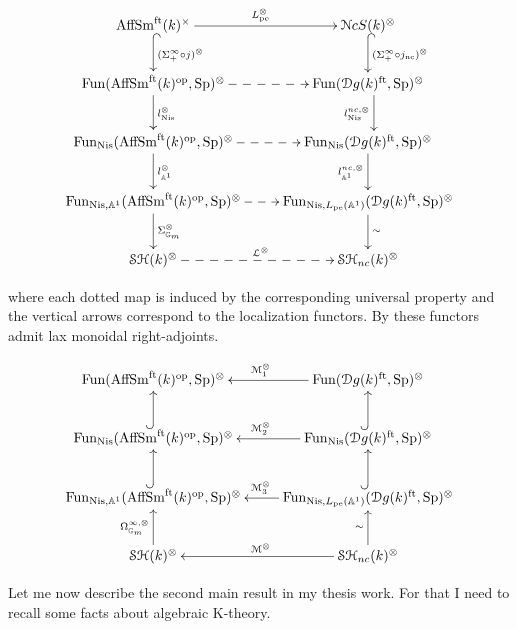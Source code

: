 \begin{refsection}
\begin{equation}
\label{diagramaleft}
\xymatrix{
\aff^{\times}\ar@{^{(}->}[d]^{(\Sigma^{\infty}_{+}\circ j)^{\otimes}}\ar[r]^{L_\mathrm{pe}^{\otimes}}& \nck^{\otimes}\ar@{^{(}->}[d]^{(\Sigma^{\infty}_{+}\circ j_{\mathrm{nc}})^{\otimes}}\\
\mathrm{Fun}(\aff^\mathrm{op}, \Sp)^{\otimes}\ar[d]^{l_\mathrm{Nis}^{\otimes}}\ar@{-->}[r]& \mathrm{Fun}(\mathcal{D}g(k)^\mathrm{ft}, \Sp)^{\otimes}\ar@<1ex>[d]_{l_\mathrm{Nis}^{nc, \otimes}}\\
\mathrm{Fun}_\mathrm{Nis}(\aff^\mathrm{op}, \Sp)^{\otimes}  \ar[d]^{l_{\mathbb{A}^1}^{\otimes}}\ar@{-->}[r]& \mathrm{Fun}_\mathrm{Nis}(\mathcal{D}g(k)^\mathrm{ft}, \Sp)^{\otimes}\ar[d]_{l_{\mathbb{A}^1}^{nc,\otimes}} \\
\mathrm{Fun}_{\mathrm{Nis}, \mathbb{A}^1}(\aff^\mathrm{op}, \Sp)^{\otimes}  \ar[d]^{\Sigma_{\mathbb{G}_m}^{\otimes}}\ar@{-->}[r]& \mathrm{Fun}_{\mathrm{Nis}, L_\mathrm{pe}(\mathbb{A}^1)}(\mathcal{D}g(k)^\mathrm{ft}, \Sp)^{\otimes}\ar[d]^{\sim} \\
\stmonoidalk\ar@{-->}[r]^{\mathcal{L}^{\otimes}}&\stncmonoidalk
}
\end{equation}

\noindent where each dotted map is induced by the corresponding universal property and the vertical arrows correspond to the localization functors. By \cite[8.3.2.7]{lurie-ha} these functors admit lax monoidal right-adjoints.


\begin{equation}
\label{diagramaright}
\xymatrix{
\mathrm{Fun}(\aff^\mathrm{op}, \Sp)^{\otimes}& \ar[l]_{\M_1^{\otimes}} \mathrm{Fun}(\mathcal{D}g(k)^\mathrm{ft}, \Sp)^{\otimes}\\
\ar@{^{(}->}[u]  \mathrm{Fun}_\mathrm{Nis}(\aff^\mathrm{op}, \Sp)^{\otimes}  & \ar@{^{(}->}[u] \ar[l]_{\M_2^{\otimes}} \mathrm{Fun}_\mathrm{Nis}(\mathcal{D}g(k)^\mathrm{ft}, \Sp)^{\otimes}\\
\ar@{^{(}->}[u]  \mathrm{Fun}_{\mathrm{Nis}, \mathbb{A}^1}(\aff^\mathrm{op}, \Sp)^{\otimes} & \ar@{^{(}->}[u] \ar[l]_{\M_3^{\otimes}} \mathrm{Fun}_{\mathrm{Nis}, L_\mathrm{pe}(\mathbb{A}^1)}(\mathcal{D}g(k)^\mathrm{ft}, \Sp)^{\otimes} \\
\stmonoidalk \ar[u]^{\Omega^{\infty,\otimes}_{\mathbb{G}_m}}& \ar[l]_{\M^{\otimes}}\stncmonoidalk \ar[u]^{\sim}
}
\end{equation}

Let me now describe the second main result in my thesis work. For that I need to recall some facts about algebraic K-theory. \\


\end{refsection}
